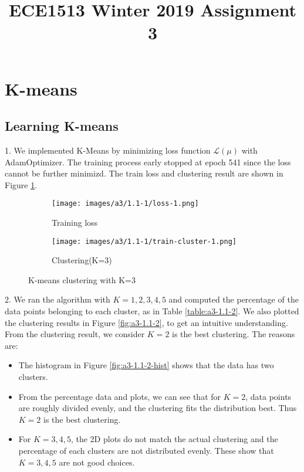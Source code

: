 \documentclass[12pt]{article}
\begin{document}
 
\title{ECE1513 Winter 2019 Assignment 3}

\maketitle

\section{K-means}

\subsection{Learning K-means}

1. We implemented K-Means by minimizing loss function $\mathcal{L}(\mu)$ with AdamOptimizer. The training process early stopped at epoch 541 since the loss cannot be further minimizd. The train loss and clustering result are shown in Figure \ref{fig:a3-1.1-1}.

\begin{figure}[!htb]
\centering
\begin{subfigure}{.5\textwidth}
  \centering
  \texttt{[image: images/a3/1.1-1/loss-1.png]}
  \caption{Training loss}
\end{subfigure}%
\begin{subfigure}{.5\textwidth}
  \centering
  \texttt{[image: images/a3/1.1-1/train-cluster-1.png]}
  \caption{Clustering(K=3)}
\end{subfigure}
\caption{K-means clustering with K=3}
\label{fig:a3-1.1-1}
\end{figure}

2. We ran the algorithm with $K = 1,2,3,4,5$ and computed the percentage of the data points belonging to each cluster, as in Table \ref{table:a3-1.1-2}. We also plotted the clustering results in Figure \ref{fig:a3-1.1-2}, to get an intuitive understanding. From the clustering result, we consider $K = 2$ is the best clustering. The reasons are:

\begin{itemize}
    \item The histogram in Figure \ref{fig:a3-1.1-2-hist} shows that the data has two clusters.
    \item From the percentage data and plots, we can see that for $K=2$, data points are roughly divided evenly, and the clustering fits the distribution best. Thus $K=2$ is the best clustering.
    \item For $K=3,4,5$, the 2D plots do not match the actual clustering and the percentage of each clusters are not distributed evenly. These show that $K=3,4,5$ are not good choices. 
\end{itemize}
\end{document}
